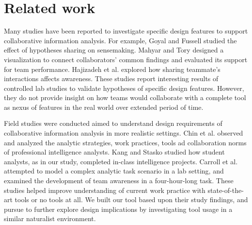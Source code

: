 \section{Related work}\label{related-work}

Many studies have been reported to investigate specific design features
to support collaborative information analysis. For example, Goyal and
Fussell \autocite{Goyal2016} studied the effect of hypotheses sharing on
sensemaking. Mahyar and Tory \autocite{Mahyar2013b} designed a
visualization to connect collaborators' common findings and evaluated
its support for team performance. Hajizadeh et al.
\autocite{Hajizadeh2013} explored how sharing teammate's interactions
affects awareness. These studies report interesting results of
controlled lab studies to validate hypotheses of specific design
features. However, they do not provide insight on how teams would
collaborate with a complete tool as nexus of features in the real world
over extended period of time.

Field studies were conducted aimed to understand design requirements of
collaborative information analysis in more realistic settings. Chin et
al. \autocite{Chin2009} observed and analyzed the analytic strategies,
work practices, tools ad collaboration norms of professional
intelligence analysts. Kang and Stasko \autocite{Kang2011} studied how
student analysts, as in our study, completed in-class intelligence
projects. Carroll et al. \autocite{Carroll2013} attempted to model a
complex analytic task scenario in a lab setting, and examined the
development of team awareness in a four-hour-long task. These studies
helped improve understanding of current work practice with
state-of-the-art tools or no tools at all. We built our tool based upon
their study findings, and pursue to further explore design implications
by investigating tool usage in a similar naturalist environment.


